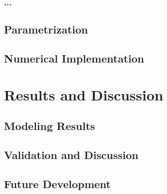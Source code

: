 \subsubsection{...}
\subsection{Parametrization}
\subsection{Numerical Implementation}

\section{Results and Discussion}
\subsection{Modeling Results}
\subsection{Validation and Discussion}
\subsection{Future Development}





\newpage
\scriptsize
\printnomenclature




\newpage





              